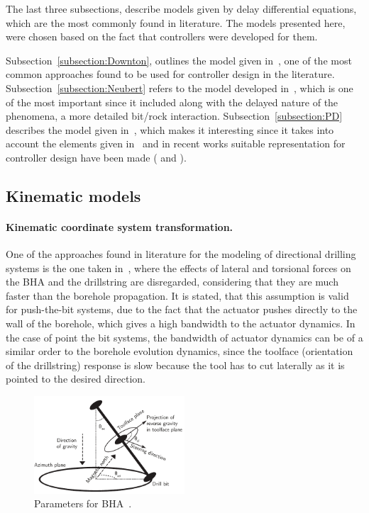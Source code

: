 The last three subsections, describe models given by delay differential equations, which are the most commonly found in literature. The models presented here, were chosen based on the fact that controllers were developed for them.

 Subsection~\ref{subsection:Downton}, outlines the model given in~\cite{Down07}, one of the most common approaches found to be used for controller design in the literature. Subsection~\ref{subsection:Neubert} refers to the model developed in~\cite{Neub97}, which is one of the most important since it included along with the delayed nature of the phenomena, a more detailed bit/rock interaction. Subsection~\ref{subsection:PD} describes the model given in~\cite{Perneder2013}, which makes it interesting since it takes into account the elements given in~\cite{Neub97} and in recent works suitable representation for controller design have been made (\cite{Kremers2013} and \cite{Monsieurs2015}).

\subsection{Kinematic models}\label{subsection:Kinematic}

\paragraph{Kinematic coordinate system transformation.}
One of the approaches found in literature for the modeling of directional drilling systems is the one taken in~\cite{Panchal2010}, where the effects of lateral and torsional forces on the \acs{BHA} and the drillstring are disregarded, considering that they are much faster than the borehole propagation. It is stated, that this assumption is valid for push-the-bit systems, due to the fact that the actuator pushes directly to the wall of the borehole, which gives a high bandwidth to the actuator dynamics. In the case of point the bit systems, the bandwidth of actuator dynamics can be of a similar order to the borehole evolution dynamics, since the toolface (orientation of the drillstring) response is slow because the tool has to cut laterally as it is pointed to the desired direction.

\begin{figure}[ht]\centering
	\includegraphics[width=0.5\textwidth]{img/reference.pdf}
	\caption{\label{fig:referenceP}Parameters for BHA~\cite{Panchal2012}.}
\end{figure}

